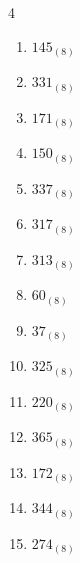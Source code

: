 \begin{multicols}{4}
\begin{enumerate}
        \phantom{$=148$}

  \item $145_{(8)}$

        \phantom{$=101$}

  \item $331_{(8)}$

        \phantom{$=217$}

  \item $171_{(8)}$

        \phantom{$=121$}

  \item $150_{(8)}$

        \phantom{$=104$}

  \item $337_{(8)}$

        \phantom{$=223$}

  \item $317_{(8)}$

        \phantom{$=207$}

  \item $313_{(8)}$

        \phantom{$=203$}

  \item $60_{(8)}$

        \phantom{$=48$}

  \item $37_{(8)}$

        \phantom{$=31$}

  \item $325_{(8)}$

        \phantom{$=213$}

\columnbreak %

\resetques

  \item $220_{(8)}$

        \phantom{$=144$}

  \item $365_{(8)}$

        \phantom{$=245$}

  \item $172_{(8)}$

        \phantom{$=122$}

  \item $344_{(8)}$

        \phantom{$=228$}

  \item $274_{(8)}$


\end{enumerate}
\end{multicols}
